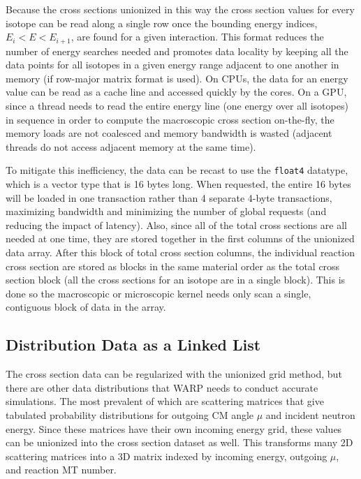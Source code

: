 Because the cross sections unionized in this way the cross section values for every isotope can be read along a single row once the bounding energy indices, $E_i<E<E_{i+1}$, are found for a given interaction.  This format reduces the number of energy searches needed and promotes data locality by keeping all the data points for all isotopes in a given energy range adjacent to one another in memory (if row-major matrix format is used).  On CPUs, the data for an energy value can be read as a cache line and accessed quickly by the cores.  On a GPU, since a thread needs to read the entire energy line (one energy over all isotopes) in sequence in order to compute the macroscopic cross section on-the-fly, the memory loads are not coalesced and memory bandwidth is wasted (adjacent threads do not access adjacent memory at the same time).  %

To mitigate this inefficiency, the data can be recast to use the  \lstinline{float4} datatype, which is a vector type that is 16 bytes long.  When requested, the entire 16 bytes will be loaded in one transaction rather than 4 separate 4-byte transactions, maximizing bandwidth and minimizing the number of global requests (and reducing the impact of latency).  Also, since all of the total cross sections are all needed at one time, %
 they are stored together in the first columns of the unionized data array.  After this block of total cross section columns, the individual reaction cross section are stored as blocks in the same material order as the total cross section block (all the cross sections for an isotope are in a single block).%
   This is done so the macroscopic or microscopic kernel needs only scan a single, contiguous block of data in the array.

\subsection{Distribution Data as a Linked List}

The cross section data can be regularized with the unionized grid method, but there are other data distributions that WARP needs to conduct accurate simulations.  The most prevalent of which are scattering matrices that give tabulated probability distributions for outgoing CM angle $\mu$ and incident neutron energy.  Since these matrices have their own incoming energy grid, these values can be unionized into the cross section dataset as well.  This transforms many 2D scattering matrices into a 3D matrix indexed by incoming energy, outgoing $\mu$, and reaction MT number.  

